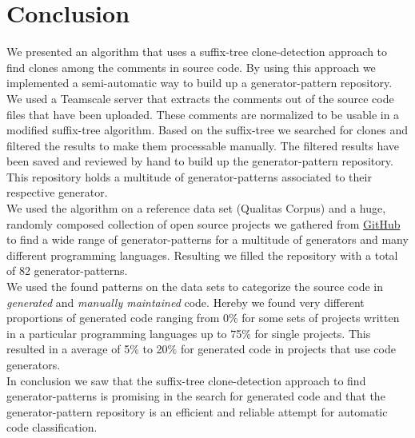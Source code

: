 
\chapter{Conclusion}\label{chapter:conclusion}
We presented an algorithm that uses a suffix-tree clone-detection approach to find clones among the comments in source code. By using this approach we implemented a semi-automatic way to build up a generator-pattern repository.\\
We used a Teamscale server that extracts the comments out of the source code files that have been uploaded. These comments are normalized to be usable in a modified suffix-tree algorithm. Based on the suffix-tree we searched for clones and filtered the results to make them processable manually. The filtered results have been saved and reviewed by hand to build up the generator-pattern repository. This repository holds a multitude of generator-patterns associated to their respective generator.\\
We used the algorithm on a reference data set (Qualitas Corpus) and a huge, randomly composed collection of open source projects we gathered from \href{https://github.com}{GitHub} to find a wide range of generator-patterns for a multitude of generators and many different programming languages. Resulting we filled the repository with a total of 82 generator-patterns.\\
We used the found patterns on the data sets to categorize the source code in \textit{generated} and \textit{manually maintained} code. Hereby we found very different proportions of generated code ranging from 0\% for some sets of projects written in a particular programming languages up to 75\% for single projects. This resulted in a average of 5\% to 20\% for generated code in projects that use code generators.\\
In conclusion we saw that the suffix-tree clone-detection approach to find generator-patterns is promising in the search for generated code and that the generator-pattern repository is an efficient and reliable attempt for automatic code classification.